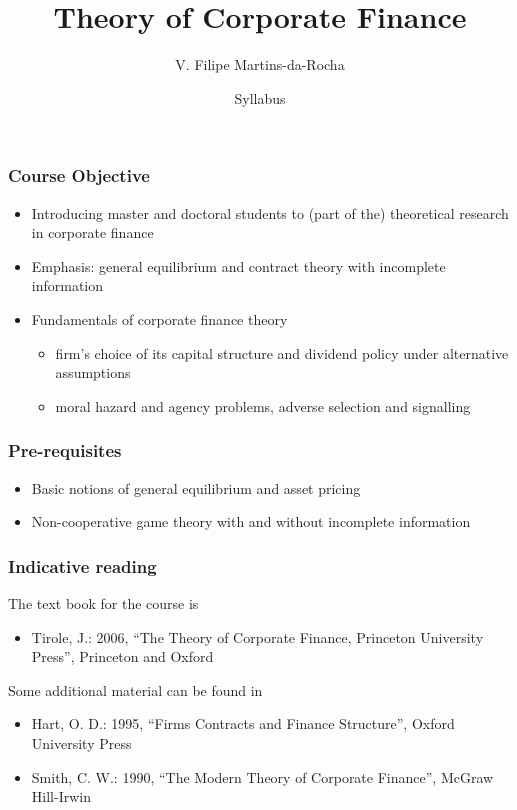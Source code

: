 \documentclass[blue]{beamer}
\title[Corporate Finance]{Theory of Corporate Finance}
\author[Victor Filipe]{V. Filipe Martins-da-Rocha}
\institute[FGV EESP]{Escola de Economia de S\~ao Paulo}
\date[April--June, 2026]{Syllabus}
\theoremstyle{definition}
\theoremstyle{example}
\begin{document}
\frame{\titlepage}





\begin{frame}\frametitle{Course Objective}

\begin{itemize}
\item Introducing master and doctoral students to (part of the) theoretical research in corporate finance
\item Emphasis: general equilibrium and contract theory with incomplete information
\item Fundamentals of corporate finance theory
    \begin{itemize}
    \item firm's choice of its capital structure and dividend policy under alternative assumptions
    \item moral hazard and agency problems, adverse selection and signalling
    \end{itemize}
\end{itemize}

\end{frame}


\begin{frame}\frametitle{Pre-requisites}

\begin{itemize}
\item Basic notions of general equilibrium and asset pricing
\item Non-cooperative game theory with and without incomplete information
\end{itemize}

\end{frame}


\begin{frame}\frametitle{Indicative reading}

The text book for the course is
\begin{itemize}
\item \alert{Tirole, J.: 2006, ``The Theory of Corporate Finance, Princeton University Press'', Princeton and Oxford}
\end{itemize}

Some additional material can be found in
\begin{itemize}
\item Hart, O. D.: 1995, ``Firms Contracts and Finance Structure'', Oxford University Press
\item Smith, C. W.: 1990, ``The Modern Theory of Corporate Finance'', McGraw Hill-Irwin
\end{itemize}

\end{frame}
\end{document}
